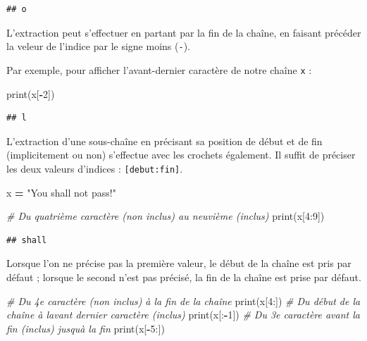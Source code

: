 \documentclass[
  12pt,
]{book}
\newenvironment{Shaded}{\begin{snugshade}}{\end{snugshade}}
\newcommand{\BuiltInTok}[1]{#1}
\newcommand{\CommentTok}[1]{\textcolor[rgb]{0.56,0.35,0.01}{\textit{#1}}}
\newcommand{\DecValTok}[1]{\textcolor[rgb]{0.00,0.00,0.81}{#1}}
\newcommand{\NormalTok}[1]{#1}
\newcommand{\OperatorTok}[1]{\textcolor[rgb]{0.81,0.36,0.00}{\textbf{#1}}}
\newcommand{\StringTok}[1]{\textcolor[rgb]{0.31,0.60,0.02}{#1}}
\numberwithin{equation}{section}
\numberwithin{countremarque}{section}
\begin{document}
\begin{lstlisting}
## o
\end{lstlisting}

L'extraction peut s'effectuer en partant par la fin de la chaîne, en faisant précéder la veleur de l'indice par le signe moins (\texttt{-}).

Par exemple, pour afficher l'avant-dernier caractère de notre chaîne \texttt{x} :

\begin{Shaded}
\begin{Highlighting}[]
\BuiltInTok{print}\NormalTok{(x[}\OperatorTok{{-}}\DecValTok{2}\NormalTok{])}
\end{Highlighting}
\end{Shaded}

\begin{lstlisting}
## l
\end{lstlisting}

L'extraction d'une sous-chaîne en précisant sa position de début et de fin (implicitement ou non) s'effectue avec les crochets également. Il suffit de préciser les deux valeurs d'indices : \texttt{{[}debut:fin{]}}.

\begin{Shaded}
\begin{Highlighting}[]
\NormalTok{x }\OperatorTok{=} \StringTok{"You shall not pass!"}

\CommentTok{\# Du quatrième caractère (non inclus) au neuvième (inclus)}
\BuiltInTok{print}\NormalTok{(x[}\DecValTok{4}\NormalTok{:}\DecValTok{9}\NormalTok{])}
\end{Highlighting}
\end{Shaded}

\begin{lstlisting}
## shall
\end{lstlisting}

Lorsque l'on ne précise pas la première valeur, le début de la chaîne est pris par défaut ; lorsque le second n'est pas précisé, la fin de la chaîne est prise par défaut.

\begin{Shaded}
\begin{Highlighting}[]
\CommentTok{\# Du 4e caractère (non inclus) à la fin de la chaîne}
\BuiltInTok{print}\NormalTok{(x[}\DecValTok{4}\NormalTok{:])}
\CommentTok{\# Du début de la chaîne à l\textquotesingle{}avant dernier caractère (inclus)}
\BuiltInTok{print}\NormalTok{(x[:}\OperatorTok{{-}}\DecValTok{1}\NormalTok{])}
\CommentTok{\# Du 3e caractère avant la fin (inclus) jusqu\textquotesingle{}à la fin}
\BuiltInTok{print}\NormalTok{(x[}\OperatorTok{{-}}\DecValTok{5}\NormalTok{:])}
\end{Highlighting}
\end{Shaded}
\end{document}
